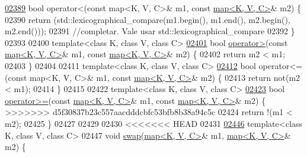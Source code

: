 \begin{DoxyCode}
\hyperlink{classaed2_1_1map_a8ff07f6a24c290ea7e8f63ec7ab24f8d_a8ff07f6a24c290ea7e8f63ec7ab24f8d}{02389} \textcolor{keywordtype}{bool} operator<(const map<K, V, C>& m1, \textcolor{keyword}{const} \hyperlink{classaed2_1_1map}{map<K, V, C>}& m2) \{
02390     \textcolor{keywordflow}{return} (std::lexicographical\_compare(m1.begin(), m1.end(), m2.begin(), m2.end()));
02391     \textcolor{comment}{//completar.  Vale usar std::lexicographical\_compare}
02392 \}
02393 
02400 \textcolor{keyword}{template}<\textcolor{keyword}{class} K, \textcolor{keyword}{class} V, \textcolor{keyword}{class} C>
\hyperlink{classaed2_1_1map_a2000cd874b72034ce7fe730c811b6c63_a2000cd874b72034ce7fe730c811b6c63}{02401} \textcolor{keywordtype}{bool} \hyperlink{classaed2_1_1map_a2000cd874b72034ce7fe730c811b6c63_a2000cd874b72034ce7fe730c811b6c63}{operator>}(\textcolor{keyword}{const} \hyperlink{classaed2_1_1map}{map<K, V, C>}& m1, \textcolor{keyword}{const} \hyperlink{classaed2_1_1map}{map<K, V, C>}& m2) \{
02402     \textcolor{keywordflow}{return} m2 < m1;
02403 \}
02404 
02411 \textcolor{keyword}{template}<\textcolor{keyword}{class} K, \textcolor{keyword}{class} V, \textcolor{keyword}{class} C>
\hyperlink{classaed2_1_1map_afe374b37f17263d0cad3ee19a590d208_afe374b37f17263d0cad3ee19a590d208}{02412} \textcolor{keywordtype}{bool} operator<=(const map<K, V, C>& m1, \textcolor{keyword}{const} \hyperlink{classaed2_1_1map}{map<K, V, C>}& m2) \{
02413     \textcolor{keywordflow}{return} not(m2 < m1);
02414 \}
02415 
02422 \textcolor{keyword}{template}<\textcolor{keyword}{class} K, \textcolor{keyword}{class} V, \textcolor{keyword}{class} C>
\hyperlink{classaed2_1_1map_a093a6d1a055339c5fc6297a1d47a9159_a093a6d1a055339c5fc6297a1d47a9159}{02423} \textcolor{keywordtype}{bool} \hyperlink{classaed2_1_1map_a093a6d1a055339c5fc6297a1d47a9159_a093a6d1a055339c5fc6297a1d47a9159}{operator>=}(\textcolor{keyword}{const} \hyperlink{classaed2_1_1map}{map<K, V, C>}& m1, \textcolor{keyword}{const} \hyperlink{classaed2_1_1map}{map<K, V, C>}& m2) \{
>>>>>>> d5f30837b23c557aacdddcbfc53bfb8b38a94c5c
02424     \textcolor{keywordflow}{return} !(m1 < m2);
02425 \}
02427 
02429 
02430 
<<<<<<< HEAD
02431 
\hypertarget{map3_8h_source_l02446}{}\hyperlink{classaed2_1_1map_a119cb2938bbc11c25ebd4fb824782a72_a119cb2938bbc11c25ebd4fb824782a72}{02446} \textcolor{keyword}{template}<\textcolor{keyword}{class} K, \textcolor{keyword}{class} V, \textcolor{keyword}{class} C>
02447 \textcolor{keywordtype}{void} \hyperlink{namespaceaed2_ab24ac4be44835194ce27a61969e4a292_ab24ac4be44835194ce27a61969e4a292}{swap}(\hyperlink{classaed2_1_1map}{map<K, V, C>}& m1, \hyperlink{classaed2_1_1map}{map<K, V, C>}& m2) \{

\end{DoxyCode}
